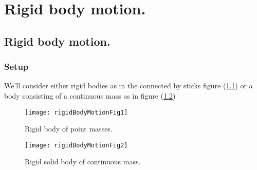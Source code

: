 %
%


\chapter{Rigid body motion.}
\label{chap:rigidBodyMotion}
{}
\date{Mar 7, 2012}

\beginArtWithToc

\section{Rigid body motion.}

\subsection{Setup}

We'll consider either rigid bodies as in the connected by sticks figure (\ref{fig:rigidBodyMotion:rigidBodyMotionFig1}) or a body consisting of a continuous mass as in figure (\ref{fig:rigidBodyMotion:rigidBodyMotionFig2})

\begin{figure}[htp]
   \centering
   \texttt{[image: rigidBodyMotionFig1]}
   \caption{Rigid body of point masses.}\label{fig:rigidBodyMotion:rigidBodyMotionFig1}
\end{figure}

\begin{figure}[htp]
   \centering
   \texttt{[image: rigidBodyMotionFig2]}
   \caption{Rigid solid body of continuous mass.}\label{fig:rigidBodyMotion:rigidBodyMotionFig2}
\end{figure}

